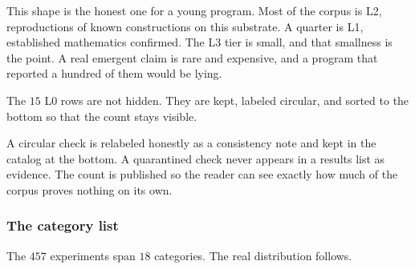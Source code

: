 This shape is the honest one for a young program. Most of the corpus is L2, reproductions of known constructions on this substrate. A quarter is L1, established mathematics confirmed. The L3 tier is small, and that smallness is the point. A real emergent claim is rare and expensive, and a program that reported a hundred of them would be lying.

The $15$ L0 rows are not hidden. They are kept, labeled circular, and sorted to the bottom so that the count stays visible.

\begin{principle}
A circular check is relabeled honestly as a consistency note and kept in the catalog at the bottom. A quarantined check never appears in a results list as evidence. The count is published so the reader can see exactly how much of the corpus proves nothing on its own.
\end{principle}

\subsubsection{The category list}

The $457$ experiments span $18$ categories. The real distribution follows.


